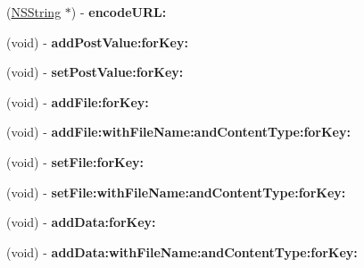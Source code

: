 \begin{DoxyCompactItemize}
\item 
\hypertarget{interface_a_s_i_form_data_request_ab8c6677cbdb0cd4bf7660b79e5afa334}{
(\hyperlink{class_n_s_string}{\-N\-S\-String} $\ast$) -\/ {\bfseries encode\-U\-R\-L\-:}}
\label{interface_a_s_i_form_data_request_ab8c6677cbdb0cd4bf7660b79e5afa334}

\item 
\hypertarget{interface_a_s_i_form_data_request_af9571a143a9feeb009c33c458447aa98}{
(void) -\/ {\bfseries add\-Post\-Value\-:for\-Key\-:}}
\label{interface_a_s_i_form_data_request_af9571a143a9feeb009c33c458447aa98}

\item 
\hypertarget{interface_a_s_i_form_data_request_a90236e7099afbab72bb160029df5a368}{
(void) -\/ {\bfseries set\-Post\-Value\-:for\-Key\-:}}
\label{interface_a_s_i_form_data_request_a90236e7099afbab72bb160029df5a368}

\item 
\hypertarget{interface_a_s_i_form_data_request_afa340cd3b263a621a4f52015cdb8c568}{
(void) -\/ {\bfseries add\-File\-:for\-Key\-:}}
\label{interface_a_s_i_form_data_request_afa340cd3b263a621a4f52015cdb8c568}

\item 
\hypertarget{interface_a_s_i_form_data_request_ae413f676daaf869aa3cac76371466c16}{
(void) -\/ {\bfseries add\-File\-:with\-File\-Name\-:and\-Content\-Type\-:for\-Key\-:}}
\label{interface_a_s_i_form_data_request_ae413f676daaf869aa3cac76371466c16}

\item 
\hypertarget{interface_a_s_i_form_data_request_a8b097474a664290880231fd4439f352e}{
(void) -\/ {\bfseries set\-File\-:for\-Key\-:}}
\label{interface_a_s_i_form_data_request_a8b097474a664290880231fd4439f352e}

\item 
\hypertarget{interface_a_s_i_form_data_request_a1b319de7b302e41e0f2b62b04efd4976}{
(void) -\/ {\bfseries set\-File\-:with\-File\-Name\-:and\-Content\-Type\-:for\-Key\-:}}
\label{interface_a_s_i_form_data_request_a1b319de7b302e41e0f2b62b04efd4976}

\item 
\hypertarget{interface_a_s_i_form_data_request_abeb27ef3dc358d5e0a27ba3a077a6653}{
(void) -\/ {\bfseries add\-Data\-:for\-Key\-:}}
\label{interface_a_s_i_form_data_request_abeb27ef3dc358d5e0a27ba3a077a6653}

\item 
\hypertarget{interface_a_s_i_form_data_request_a8ea88f81e036a80e7e7b7f9af04ac421}{
(void) -\/ {\bfseries add\-Data\-:with\-File\-Name\-:and\-Content\-Type\-:for\-Key\-:}}
\label{interface_a_s_i_form_data_request_a8ea88f81e036a80e7e7b7f9af04ac421}


\end{DoxyCompactItemize}
